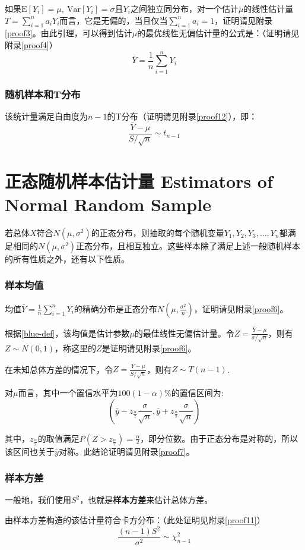 \documentclass[UTF8]{ctexbook}
\begin{document}
如果$\mathrm{E}[Y_i]=\mu,\ \mathrm{Var}[Y_i]=\sigma$且$Y_i$之间独立同分布，对一个估计$\mu$的线性估计量$T=\sum_{i=1}^na_iY_i$而言，它是无偏的，当且仅当$\sum_{i=1}^na_i=1$，证明请见附录\ref{proof3}。由此引理，可以得到估计$\mu$的最优线性无偏估计量的公式是：（证明请见附录\ref{proof4}）
\[
	\bar{Y}=\frac{1}{n}\sum_{i=1}^nY_i
\]

\subsubsection{随机样本和T分布}
该统计量满足自由度为$n-1$的T分布（证明请见附录\ref{proof12}），即：
\[
	\frac{\bar Y-\mu}{S/\sqrt{n}}\sim t_{n-1}
\]
\section{正态随机样本估计量 Estimators of Normal Random Sample}
若总体$X$符合$N(\mu,\sigma^2)$的正态分布，则抽取的每个随机变量$Y_1,Y_2,Y_3,\dots,Y_n$都满足相同的$N(\mu,\sigma^2)$正态分布，且相互独立。这些样本除了满足上述一般随机样本的所有性质之外，还有以下性质。

\subsubsection{样本均值}
均值$\bar Y=\frac{1}{n}\sum_{i=1}^nY_i$的精确分布是正态分布$N(\mu,\frac{\sigma^2}{n})$，证明请见附录\ref{proof6}。

根据\ref{blue-def}，该均值是估计参数$\mu$的最佳线性无偏估计量。令$Z=\frac{\bar{Y}-\mu}{\sigma/\sqrt n}$，则有$Z\sim N(0,1)$，称这里的$Z$是证明请见附录\ref{proof6}。

在未知总体方差的情况下，令$Z=\frac{\bar{Y}-\mu}{S/\sqrt n}$，则有$Z\sim T(n-1)$.

对$\mu$而言，其中一个置信水平为$100(1-\alpha)\%$的置信区间为:
\[
	\left(\bar y-z_{\frac{\alpha}{2}}\frac{\sigma}{\sqrt n},\bar y+z_{\frac{\alpha}{2}}\frac{\sigma}{\sqrt n}\right)
\]

其中，$z_{\frac{\alpha}{2}}$的取值满足$P(Z>z_\frac{\alpha}{2})=\frac{\alpha}{2}$，即分位数。由于正态分布是对称的，所以该区间也关于$\bar y$对称。此结论证明请见附录\ref{proof7}。
\subsubsection{样本方差}
一般地，我们使用$S^2$，也就是\textbf{样本方差}来估计总体方差。

由样本方差构造的该估计量符合卡方分布：（此处证明见附录\ref{proof11}）
\[
	\frac{(n-1)S^2}{\sigma^2}\sim\chi_{n-1}^2 
\]
\end{document}
